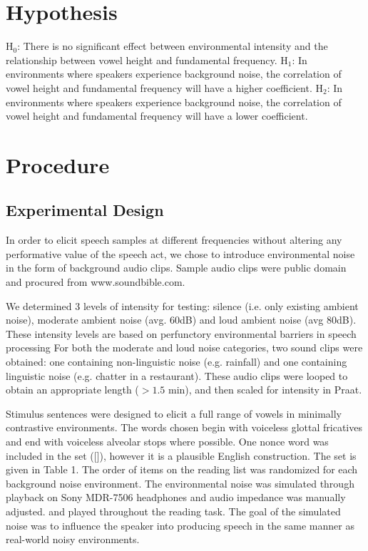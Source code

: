 \documentclass[12pt]{article}
\begin{document}
	\section{Hypothesis}
	$\textrm{H}_0$: There is no significant effect between environmental intensity and the relationship between vowel height and fundamental frequency.
	\bigbreak
	\noindent $\textrm{H}_1$: In environments where speakers experience background noise, the correlation of vowel height and fundamental frequency will have a higher coefficient.
	\bigbreak
	\noindent $\textrm{H}_2$:  In environments where speakers experience background noise, the correlation of vowel height and fundamental frequency will have a lower coefficient.
	\section{Procedure}
	\subsection{Experimental Design}
	In order to elicit speech samples at different frequencies without altering any performative value of the speech act, we chose to introduce environmental noise in the form of background audio clips.  Sample audio clips were public domain and procured from www.soundbible.com.
	
	We determined 3 levels of intensity for testing: silence (i.e. only existing ambient noise), moderate ambient noise (avg. 60dB) and loud ambient noise (avg 80dB).  These intensity levels are based on perfunctory environmental barriers in speech processing \citep{psych} For both the moderate and loud noise categories, two sound clips were obtained:  one containing non-linguistic noise (e.g. rainfall) and one containing linguistic noise (e.g. chatter in a restaurant).  These audio clips were looped to obtain an appropriate length ($>1.5$ min), and then scaled for intensity in Praat.
	
	Stimulus sentences were designed to elicit a full range of vowels in minimally contrastive environments. The words chosen begin with voiceless glottal fricatives and end with voiceless alveolar stops where possible. One nonce word was included in the set ([]), however it is a plausible English construction.  The set is given in Table 1.  The order of items on the reading list was randomized for each background noise environment. The environmental noise was simulated through playback on Sony MDR-7506 headphones and audio impedance was manually adjusted. and played throughout the reading task. The goal of the simulated noise was to influence the speaker into producing speech in the same manner as real-world noisy environments. 
	
\end{document}
